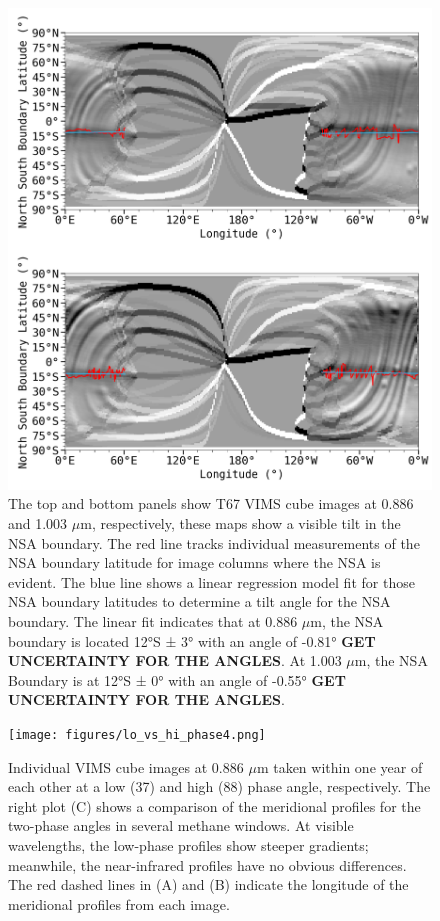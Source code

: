 \documentclass[apj,tighten]{emulateapj}
\begin{document}
\begin{figure}[tbhp]
\includegraphics[width=\textwidth]{figures/TiltT67.png}
\caption{\footnotesize The top and bottom panels show T67 VIMS cube images at 0.886 and 1.003 $\mu$m, respectively, these maps show a visible tilt in the NSA boundary. The red line tracks individual measurements of the NSA boundary latitude for image columns where the NSA is evident. The blue line shows a linear regression model fit for those NSA boundary latitudes to determine a tilt angle for the NSA boundary. The linear fit indicates that at 0.886 $\mu$m, the NSA boundary is located 12°S ± 3° with an angle of -0.81° \textbf{GET UNCERTAINTY FOR THE ANGLES}. At 1.003 $\mu$m, the NSA Boundary is at 12°S ± 0° with an angle of -0.55° \textbf{GET UNCERTAINTY FOR THE ANGLES}.
\label{figure:tiltT61}}
\end{figure}

\begin{figure}[tbhp]
\texttt{[image: figures/lo\_vs\_hi\_phase4.png]}
\caption{\footnotesize Individual VIMS cube images at 0.886 $\mu$m taken within one year of each other at a low (37\degree{}) and high (88\degree{}) phase angle, respectively. The right plot (C) shows a comparison of the meridional profiles for the two-phase angles in several methane windows. At visible wavelengths, the low-phase profiles show steeper gradients; meanwhile, the near-infrared profiles have no obvious differences. The red dashed lines in (A) and (B) indicate the longitude of the meridional profiles from each image.
\label{figure:lo_vs_hi_phase3}}
\end{figure}
\end{document}
